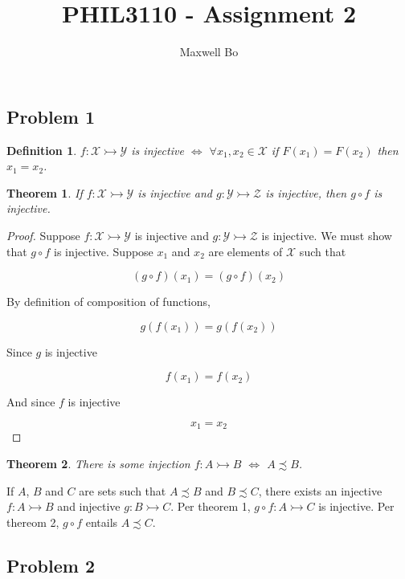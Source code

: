 \documentclass[a4paper]{article}
\title{PHIL3110 - Assignment 2}
\author{Maxwell Bo}
\newtheorem{theorem}{Theorem}
\newtheorem{definition}{Definition}
\newtheorem{proof}{Proof}
\begin{document}
 

\maketitle

\subsection*{Problem 1}

\begin{definition}
$f: \mathcal{X} \rightarrowtail \mathcal{Y}$ is injective $\Leftrightarrow$ $\forall x_1, x_2 \in \mathcal{X}$ if $F(x_1) = F(x_2)$ then $x_1 = x_2$.
\end{definition}

\begin{theorem}
    If $f: \mathcal{X} \rightarrowtail \mathcal{Y}$ is injective and $g: \mathcal{Y} \rightarrowtail \mathcal{Z}$ is injective, then $g \circ f$ is injective.
\end{theorem}

\begin{proof}
Suppose $f: \mathcal{X} \rightarrowtail \mathcal{Y}$ is injective and $g: \mathcal{Y} \rightarrowtail \mathcal{Z}$ is injective. We must show that $g \circ f$ is injective. Suppose $x_1$ and $x_2$ are elements of $\mathcal{X}$ such that

\[(g \circ f)(x_1) = (g \circ f)(x_2)\]

By definition of composition of functions,

\[g(f(x_1)) = g(f(x_2))\]

Since $g$ is injective

\[f(x_1) = f(x_2)\]

And since $f$ is injective

\[x_1 = x_2\]

\end{proof}

\begin{theorem}
There is some injection $f: A \rightarrowtail B$ $\Leftrightarrow$ $A \precsim B$.
\end{theorem}

If $A$, $B$ and $C$ are sets such that $A \precsim B$ and $B \precsim C$, there exists an injective $f: A \rightarrowtail B$ and injective $g: B \rightarrowtail C$. Per theorem 1, $g \circ f: A \rightarrowtail C$ is injective. Per thereom 2, $g \circ f$ entails $A \precsim C$.

\subsection*{Problem 2}
\end{document}
